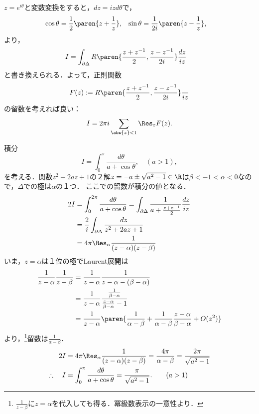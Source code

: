 \documentclass[uplatex, dvipdfmx]{jsreport}
\begin{document}
\begin{discussion}[単位円上の積分]
    $z=e^{i\theta}$と変数変換をすると，$dz=izd\theta$で，
    \begin{align*}
        \cos\theta&=\frac{1}{2}\paren{z+\frac{1}{z}},&\sin\theta&=\frac{1}{2i}\paren{z-\frac{1}{z}},
    \end{align*}
    より，
    \begin{align*}
        I&=\int_{\partial\Delta}R\paren{\frac{z+z^{-1}}{2},\frac{z-z^{-1}}{2i}}\frac{dz}{iz}
    \end{align*}
    と書き換えられる．よって，正則関数
    \[F(z):=R\paren{\frac{z+z^{-1}}{2},\frac{z-z^{-1}}{2i}}\frac{}{iz}\]
    の留数を考えれば良い：
    \[I=2\pi i\sum_{\abs{z}<1}\Res_zF(z).\]
\end{discussion}

\begin{example}
    積分
    \[I=\int^\pi_0\frac{d\theta}{a+\cos\theta},\quad(a>1),\]
    を考える．関数$z^2+2az+1$の２解$z=-a\pm\sqrt{a^2-1}\in\R$は$\beta<-1<\alpha<0$なので，$\Delta$での極は$\alpha$の１つ．
    ここでの留数が積分の値となる．
    \begin{align*}
        2I&=\int^{2\pi}_0\frac{d\theta}{a+\cos\theta}=\int_{\partial\Delta}\frac{1}{a+\frac{z+z^{-1}}{2}}\frac{dz}{iz}\\
        &=\frac{2}{i}\int_{\partial\Delta}\frac{dz}{z^2+2az+1}\\
        &=4\pi\Res_\alpha\frac{1}{(z-\alpha)(z-\beta)}
    \end{align*}
    いま，$z=\alpha$は１位の極でLaurent展開は
    \begin{align*}
        \frac{1}{z-\alpha}\frac{1}{z-\beta}&=
        \frac{1}{z-\alpha}\frac{1}{z-\alpha-(\beta-\alpha)}\\
        &=\frac{1}{z-\alpha}\frac{\frac{1}{\beta-\alpha}}{\frac{z-\alpha}{\beta-\alpha}-1}\\
        &=\frac{1}{z-\alpha}\paren{\frac{1}{\alpha-\beta}+\frac{1}{\alpha-\beta}\frac{z-\alpha}{\beta-\alpha}+O(z^2)}
    \end{align*}
    より，\footnote{$\frac{1}{z-\beta}$に$z=\alpha$を代入しても得る．冪級数表示の一意性より．}留数は$\frac{1}{\alpha-\beta}$．
    \begin{align*}
        2I&=4\pi\Res_\alpha\frac{1}{(z-\alpha)(z-\beta)}=\frac{4\pi}{\alpha-\beta}=\frac{2\pi}{\sqrt{a^2-1}}\\
        \therefore\quad I&=\int^\pi_0\frac{d\theta}{a+\cos\theta}=\frac{\pi}{\sqrt{a^2-1}}.\qquad(a>1)
    \end{align*}

\end{example}
\end{document}
